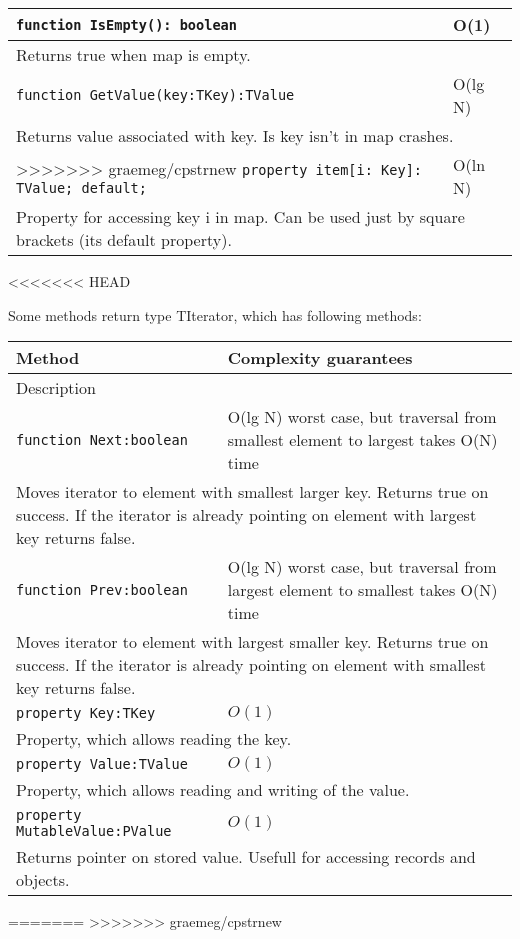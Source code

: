 \begin{longtable}{|m{10cm}|m{5cm}|}
\verb!function IsEmpty(): boolean! & O(1) \\ \hline
\multicolumn{2}{|m{15cm}|}{Returns true when map is empty.} \\\hline

\verb!function GetValue(key:TKey):TValue! & O(lg N) \\\hline
\multicolumn{2}{|m{15cm}|}{Returns value associated with key. Is key isn't in map crashes.} \\\hline

>>>>>>> graemeg/cpstrnew
\verb!property item[i: Key]: TValue; default;! & O(ln N) \\\hline
\multicolumn{2}{|m{15cm}|}{Property for accessing key i in map. Can be used just by square
brackets (its default property).} \\\hline\hline


\end{longtable}
<<<<<<< HEAD

Some methods return type TIterator, which has following methods:
\begin{longtable}{|m{10cm}|m{5cm}|}                                                             
\hline
Method & Complexity guarantees \\ \hline                                                  
\multicolumn{2}{|m{15cm}|}{Description} \\ \hline\hline                                               
\verb!function Next:boolean! & O(lg N) worst case, but traversal from smallest element to
largest takes O(N) time \\\hline
\multicolumn{2}{|m{15cm}|}{Moves iterator to element with smallest larger key. Returns true on
success. If the iterator is already pointing on element with largest key returns false.} \\\hline\hline

\verb!function Prev:boolean! & O(lg N) worst case, but traversal from largest element to
smallest takes O(N) time \\\hline
\multicolumn{2}{|m{15cm}|}{Moves iterator to element with largest smaller key. Returns true on
success. If the iterator is already pointing on element with smallest key returns false.} \\\hline\hline

\verb!property Key:TKey! & $O(1)$ \\\hline
\multicolumn{2}{|m{15cm}|}{Property, which allows reading the key.} \\\hline

\verb!property Value:TValue! & $O(1)$ \\\hline
\multicolumn{2}{|m{15cm}|}{Property, which allows reading and writing of the value.} \\\hline
\verb!property MutableValue:PValue! & $O(1)$ \\\hline
\multicolumn{2}{|m{15cm}|}{Returns pointer on stored value. Usefull for accessing records and
objects.} \\\hline


\end{longtable}
=======
>>>>>>> graemeg/cpstrnew
